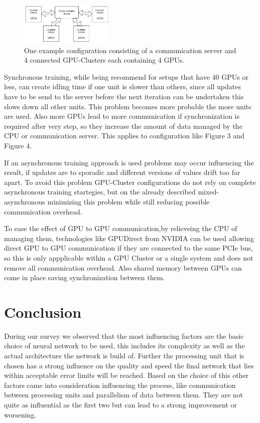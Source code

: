 \documentclass[conference]{IEEEtran}
\begin{document}
\begin{figure}
\centering
\includegraphics[width=0.4\textwidth]{cluster_setup.png}
\caption{One example configuration consisting of a communication server and 4 connected GPU-Clusters each containing 4 GPUs.}
\end{figure}
Synchronous training, while being recommend for setups that have 40 GPUs or less, can create idling time if one unit is slower than others, since all updates have to be send to the server before the next iteration can be undertaken this slows down all other units. This problem becomes more probable the more units are used. Also more GPUs lead to more communication if synchronization is required after very step, so they increase the amount of data managed by the CPU or communication server. This applies to configuration like Figure 3 and Figure 4.

If an asynchronous training approach is used problems may occur influencing the result, if updates are to sporadic and different versions of values drift too far apart. To avoid this problem GPU-Cluster configurations do not rely on complete asynchronous training startegies, but on the already described mixed-asynchronous minimizing this problem while still reducing possible communication overhead.

To ease the effect of GPU to GPU communication,by relieveing the CPU of managing them, technologies like GPUDirect from NVIDIA\cite{nvidiagpudirect2017} can be used allowing direct GPU to GPU communication if they are connected to the same PCIe bus, so this is only appplicable within a GPU Cluster or a single system and does not remove all communication overhead. Also shared memory between GPUs can come in place saving synchronization between them.




\section{Conclusion}
During our survey we observed that the most influencing factors are the basic choice of neural network to be used, this includes its complexity as well as the actual architecture the network is build of. Further the processing unit that is chosen has a strong influence on the quality and speed the final network that lies within acceptable error limits will be reached. Based on the choice of this other factors came into consideration influencing the process, like communication between processing units and parallelism of data between them. They are not quite as influential as the first two but can lead to a strong improvement or worsening.
\end{document}
